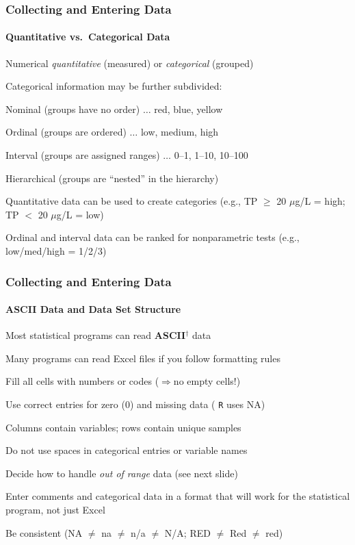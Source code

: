 \documentclass[10pt]{beamer}
\begin{document}
\begin{frame}[fragile]
\frametitle{Collecting and Entering Data}
\framesubtitle{Quantitative vs.~Categorical Data}

\bi
\item Numerical {\em quantitative} (measured) or {\em categorical}
  (grouped)

\item Categorical information may be further subdivided:
  \bi
  \item Nominal (groups have no order) $\ldots$ red, blue, yellow
  \item Ordinal (groups are ordered) $\ldots$ low, medium, high
  \item Interval (groups are assigned ranges) $\ldots$ 0--1,
    1--10, 10--100
  \item Hierarchical (groups are ``nested'' in the hierarchy)\\
  \ei

\item Quantitative data can be used to create categories (e.g., TP
  $\ge$ 20 $\mu$g/L = high; TP $<$ 20 $\mu$g/L = low)

\item Ordinal and interval data can be ranked for 
  nonparametric tests (e.g., low/med/high = 1/2/3)\\
\ei

\end{frame}


\begin{frame}
\frametitle{Collecting and Entering Data}
\framesubtitle{ASCII Data and Data Set Structure}

\bi
\item Most statistical programs can read {\bf ASCII}$^{\dag}$
  data\\

\item Many programs can read Excel files if you follow formatting rules 
	\bi
	\item Fill all cells with numbers or codes ($\Rightarrow$no empty cells!)
	\item Use correct entries for zero (0) and missing data ({\color{red} {\tt R} uses NA})
	\item Columns contain variables; rows contain unique samples
        \item Do not use spaces in categorical entries or variable names
	\item Decide how to handle {\em out of range} data
          (see next slide)
	\item Enter comments and categorical data in a format that will work
	for the statistical program, not just Excel
       \item Be consistent (NA $\ne$ na $\ne$ n/a $\ne$ N/A; RED $\ne$ Red $\ne$ red)\\
        \ei 
\ei
\end{frame}
\end{document}
